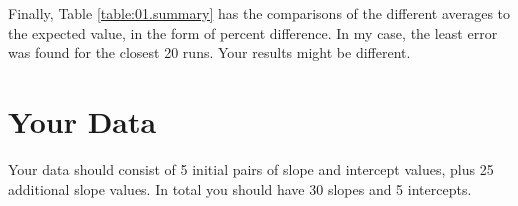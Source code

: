 Finally, Table \ref{table:01.summary} has the comparisons of the different averages to the expected value, in the form of percent difference. In my case, the least error was found for the closest 20 runs. Your results might be different.
%
\section{Your Data}
%
Your data should consist of 5 initial pairs of slope and intercept values, plus 25 additional slope values. In total you should have 30 slopes and 5 intercepts.
%
%
\newpage
